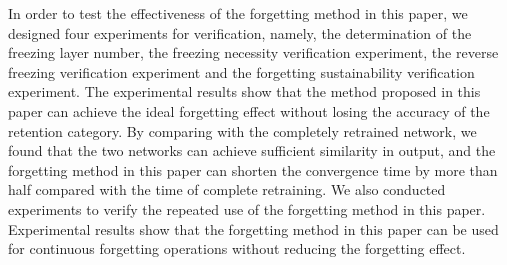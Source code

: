 \begin{abstract*}
  In order to test the effectiveness of the forgetting method in this paper, we designed four experiments for verification, 
  namely, the determination of the freezing layer number, the freezing necessity verification experiment, the reverse freezing verification experiment and the forgetting sustainability verification experiment.
  The experimental results show that the method proposed in this paper can achieve the ideal forgetting effect without losing the accuracy of the retention category.
  By comparing with the completely retrained network, we found that the two networks can achieve sufficient similarity in output, 
  and the forgetting method in this paper can shorten the convergence time by more than half compared with the time of complete retraining.
  We also conducted experiments to verify the repeated use of the forgetting method in this paper. 
  Experimental results show that the forgetting method in this paper can be used for continuous forgetting operations without reducing the forgetting effect.

\end{abstract*}
